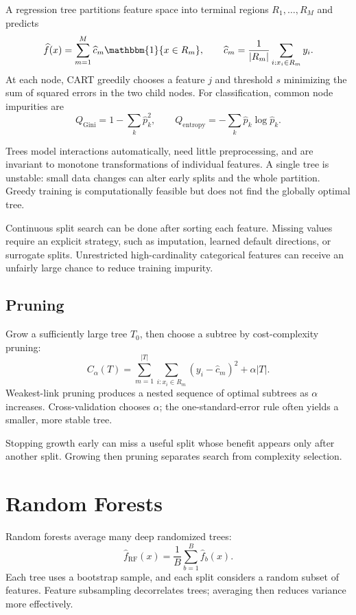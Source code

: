 \documentclass[12pt,oneside]{book}
\numberwithin{equation}{section}
\theoremstyle{definition}
\theoremstyle{plain}
\theoremstyle{remark}
\newcommand{\ind}{\mathbbm{1}}
\newcommand{\abs}[1]{\left\lvert #1 \right\rvert}
\begin{document}
A regression tree partitions feature space into terminal regions
$R_1,\ldots,R_M$ and predicts
\[
    \widehat f(x)=\sum_{m=1}^M\widehat c_m\ind\{x\in R_m\},
    \qquad
    \widehat c_m=\frac1{\abs{R_m}}\sum_{i:x_i\in R_m}y_i.
\]
At each node, CART greedily chooses a feature $j$ and threshold $s$ minimizing
the sum of squared errors in the two child nodes. For classification, common
node impurities are
\[
 Q_{\mathrm{Gini}}=1-\sum_k\widehat p_k^2,\qquad
 Q_{\mathrm{entropy}}=-\sum_k\widehat p_k\log\widehat p_k.
\]

Trees model interactions automatically, need little preprocessing, and are
invariant to monotone transformations of individual features. A single tree
is unstable: small data changes can alter early splits and the whole
partition. Greedy training is computationally feasible but does not find the
globally optimal tree.

Continuous split search can be done after sorting each feature. Missing
values require an explicit strategy, such as imputation, learned default
directions, or surrogate splits. Unrestricted high-cardinality categorical
features can receive an unfairly large chance to reduce training impurity.

\subsection{Pruning}

Grow a sufficiently large tree $T_0$, then choose a subtree by cost-complexity
pruning:
\begin{equation}
    C_\alpha(T)=\sum_{m=1}^{\abs T}
       \sum_{i:x_i\in R_m}(y_i-\widehat c_m)^2
       +\alpha\abs T.
    \label{eq:tree-pruning}
\end{equation}
Weakest-link pruning produces a nested sequence of optimal subtrees as
$\alpha$ increases. Cross-validation chooses $\alpha$; the one-standard-error
rule often yields a smaller, more stable tree.

Stopping growth early can miss a useful split whose benefit appears only
after another split. Growing then pruning separates search from complexity
selection.

\section{Random Forests}

Random forests average many deep randomized trees:
\[
    \widehat f_{\mathrm{RF}}(x)=\frac1B\sum_{b=1}^B\widehat f_b(x).
\]
Each tree uses a bootstrap sample, and each split considers a random subset of
features. Feature subsampling decorrelates trees; averaging then reduces
variance more effectively.
\end{document}
